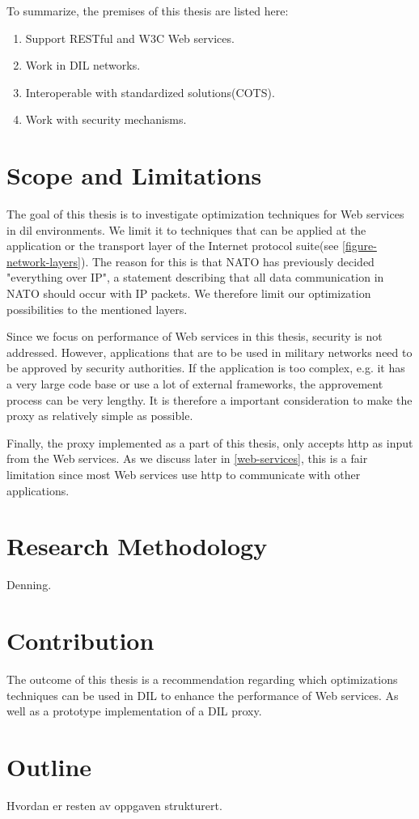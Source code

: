 To summarize, the premises of this thesis are listed here:

\begin{enumerate}
    \item Support RESTful and W3C Web services.
    \item Work in DIL networks.
    \item Interoperable with standardized solutions(COTS).
    \item Work with security mechanisms.
\end{enumerate}

\section{Scope and Limitations}

The goal of this thesis is to investigate optimization techniques for Web
services in \gls{dil} environments. We limit it to techniques that can be
applied at the application or the transport layer of the Internet protocol
suite(see \cref{figure-network-layers}). The reason for this is that NATO has
previously decided "everything over IP", a statement describing that all data
communication in NATO should occur with IP packets\cite{nnec-study}. We
therefore limit our optimization possibilities to the mentioned layers.

Since we focus on performance of Web services in this thesis, security is not
addressed. However, applications that are to be used in military
networks need to be approved by security authorities. If the application is too
complex, e.g. it has a very large code base or use a lot of external frameworks,
the approvement process can be very lengthy. It is therefore a important
consideration to make the proxy as relatively simple as possible.

Finally, the proxy implemented as a part of this thesis, only accepts \gls{http}
as input from the Web services. As we discuss later in \cref{web-services}, this
is a fair limitation since most Web services use \gls{http} to communicate with
other applications.


\section{Research Methodology}
Denning.


\section{Contribution}

The outcome of this thesis is a recommendation regarding which optimizations
techniques can be used in DIL to enhance the performance of Web services. As
well as a prototype implementation of a DIL proxy.

\section{Outline}
Hvordan er resten av oppgaven strukturert.
